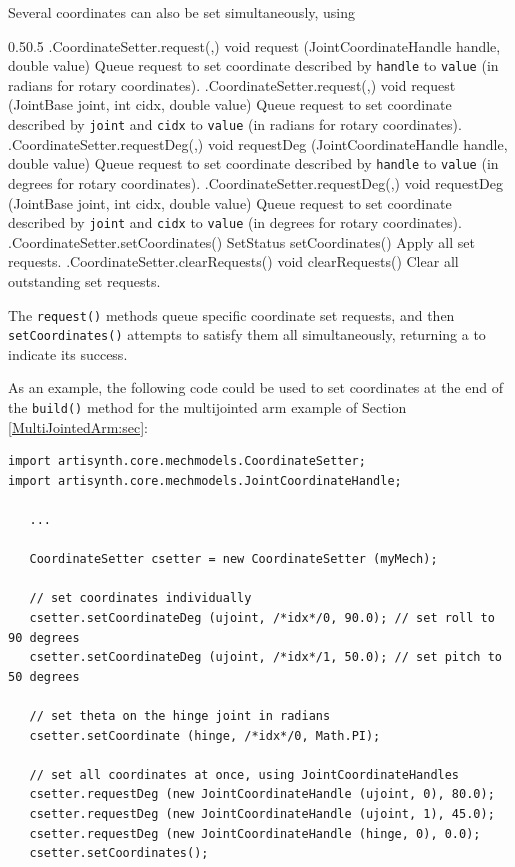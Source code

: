 Several coordinates can also be set simultaneously, using
%
\begin{methodtable}{0.5}{0.5}
\midline
%
\methodentry
{\mech.CoordinateSetter.request(,)}%
{void request (\brh JointCoordinateHandle handle, double value)}%
{Queue request to set coordinate described by {\tt handle} to {\tt value}
(in radians for rotary coordinates).}%
%
\methodentry
{\mech.CoordinateSetter.request(,)}%
{void request (\brh JointBase joint, int cidx, double value)}%
{Queue request to set coordinate described by {\tt joint} and {\tt cidx}
to {\tt value} (in radians for rotary coordinates).}%
%
\methodentry
{\mech.CoordinateSetter.requestDeg(,)}%
{void requestDeg (\brh JointCoordinateHandle handle, double value)}%
{Queue request to set coordinate described by {\tt handle} to {\tt value}
(in degrees for rotary coordinates).}%
%
\methodentry
{\mech.CoordinateSetter.requestDeg(,)}%
{void requestDeg (\brh JointBase joint, int cidx, double value)}%
{Queue request to set coordinate described by {\tt joint} and {\tt cidx}
to {\tt value} (in degrees for rotary coordinates).}%
%
\methodentry
{\mech.CoordinateSetter.setCoordinates()}%
{SetStatus setCoordinates()}%
{Apply all set requests.}%
%
\methodentry
{\mech.CoordinateSetter.clearRequests()}%
{void clearRequests()}%
{Clear all outstanding set requests.}%
%
\midline
\end{methodtable}
%
The {\tt request()} methods queue specific coordinate set requests, and then
{\tt setCoordinates()} attempts to satisfy them all simultaneously, returning
a  to indicate its success.

As an example, the following code could be used to set coordinates at the end
of the {\tt build()} method for the multijointed arm example of
Section \ref{MultiJointedArm:sec}:
%
\begin{lstlisting}[]
import artisynth.core.mechmodels.CoordinateSetter;
import artisynth.core.mechmodels.JointCoordinateHandle;

   ...

   CoordinateSetter csetter = new CoordinateSetter (myMech);

   // set coordinates individually
   csetter.setCoordinateDeg (ujoint, /*idx*/0, 90.0); // set roll to 90 degrees
   csetter.setCoordinateDeg (ujoint, /*idx*/1, 50.0); // set pitch to 50 degrees

   // set theta on the hinge joint in radians
   csetter.setCoordinate (hinge, /*idx*/0, Math.PI);

   // set all coordinates at once, using JointCoordinateHandles
   csetter.requestDeg (new JointCoordinateHandle (ujoint, 0), 80.0);
   csetter.requestDeg (new JointCoordinateHandle (ujoint, 1), 45.0);
   csetter.requestDeg (new JointCoordinateHandle (hinge, 0), 0.0);
   csetter.setCoordinates();
\end{lstlisting}
%

